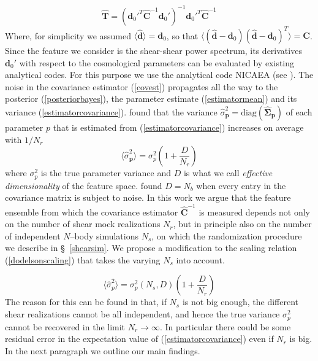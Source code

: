 \documentclass[reprint,aps,prd,superscriptaddress,showkeys,showpacs]{revtex4-1}
\newcommand{\bb}[1]{\mathbf{#1}}
\newcommand{\bbh}[1]{\mathbf{\hat{#1}}}
\newcommand{\h}[1]{\hat{#1}}
\begin{document}
\begin{equation}
\bbh{T} = (\bb{d}_0'^T\bbh{C}^{-1}\bb{d}_0')^{-1}\bb{d}_0'^T\bbh{C}^{-1}
\end{equation}
%
Where, for simplicity we assumed $\langle\bbh{d}\rangle=\bb{d}_0$, so that $\langle(\bbh{d}-\bb{d}_0)(\bbh{d}-\bb{d}_0)^T\rangle=\bb{C}$. Since the feature we consider is the shear-shear power spectrum, its derivatives $\bb{d}_0'$ with respect to the cosmological parameters can be evaluated by existing analytical codes. For this purpose we use the analytical code NICAEA (see \citep{Nicaea}). The noise in the covariance estimator (\ref{covest}) propagates all the way to the posterior (\ref{posteriorbayes}), the parameter estimate (\ref{estimatormean}) and its variance (\ref{estimatorcovariance}). \citep{DodelsonSchneider13} found that the variance $\h{\sigma}^2_\bb{p}=\mathrm{diag}(\bbh{\Sigma}_\bb{p})$ of each parameter $p$ that is estimated from (\ref{estimatorcovariance}) increases on average with $1/N_r$
\begin{equation}
\label{dodelsonscaling}
\langle\h{\sigma}_\bb{p}^2\rangle = \sigma_p^2\left(1+\frac{D}{N_r}\right)
\end{equation} 
%
where $\sigma^2_p$ is the true parameter variance and $D$ is what we call \textit{effective dimensionality} of the feature space. \citep{DodelsonSchneider13} found $D=N_b$ when every entry in the covariance matrix is subject to noise. In this work we argue that the feature ensemble from which the covariance estimator $\bbh{C}^{-1}$ is measured depends not only on the number of shear mock realizations $N_r$, but in principle also on the number of independent $N$--body simulations $N_s$, on which the randomization procedure we describe in \S~\ref{shearsim}. We propose a modification to the scaling relation (\ref{dodelsonscaling}) that takes the varying $N_s$ into account. 

\begin{equation}
\label{ourscaling}
\langle\h{\sigma}_p^2\rangle = \sigma^2_p(N_s,D)\left(1+\frac{D}{N_r}\right)
\end{equation} 
%
The reason for this can be found in that, if $N_s$ is not big enough, the different shear realizations cannot be all independent, and hence the true variance $\sigma^2_p$ cannot be recovered in the limit $N_r\rightarrow\infty$. In particular there could be some residual error in the expectation value of (\ref{estimatorcovariance}) even if $N_r$ is big. In the next paragraph we outline our main findings. 
\end{document}
